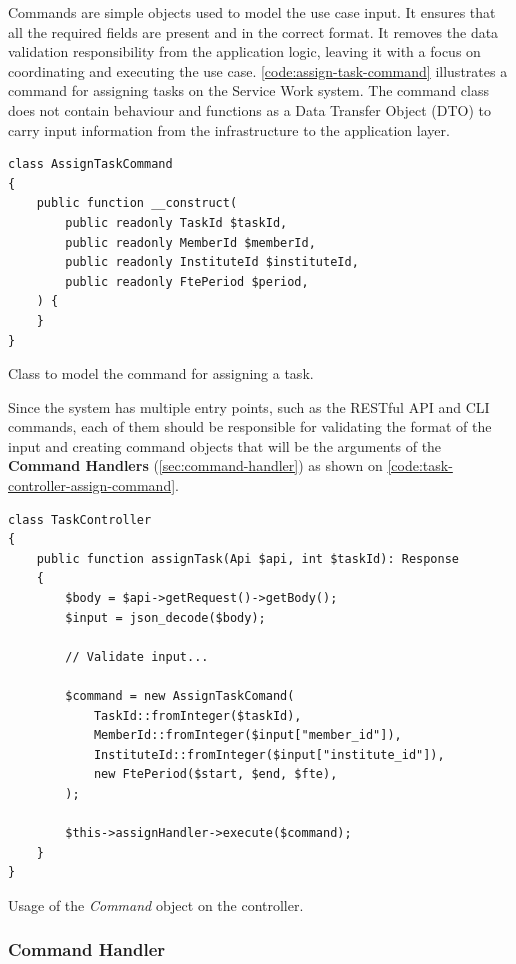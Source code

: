 Commands are simple objects used to model the use case input. It ensures that all the required fields are present and in the correct format. It removes the data validation responsibility from the application logic, leaving it with a focus on coordinating and executing the use case. \autoref{code:assign-task-command} illustrates a command for assigning tasks on the Service Work system. The command class does not contain behaviour and functions as a Data Transfer Object (DTO) to carry input information from the infrastructure to the application layer.

\begin{listing}[htbp]
\begin{verbatim}
class AssignTaskCommand
{
	public function __construct(
    	public readonly TaskId $taskId,
    	public readonly MemberId $memberId,
    	public readonly InstituteId $instituteId,
    	public readonly FtePeriod $period,
	) {
	}
}
\end{verbatim}
\caption{Class to model the command for assigning a task.}
\label{code:assign-task-command}
\end{listing}

Since the system has multiple entry points, such as the RESTful API and CLI commands, each of them should be responsible for validating the format of the input and creating command objects that will be the arguments of the \textbf{Command Handlers} (\autoref{sec:command-handler}) as shown on \autoref{code:task-controller-assign-command}.

\begin{listing}[htbp]
\begin{verbatim}
class TaskController
{
	public function assignTask(Api $api, int $taskId): Response
	{
		$body = $api->getRequest()->getBody();
		$input = json_decode($body);

		// Validate input...

		$command = new AssignTaskComand(
			TaskId::fromInteger($taskId),
			MemberId::fromInteger($input["member_id"]),
			InstituteId::fromInteger($input["institute_id"]),
			new FtePeriod($start, $end, $fte),
		);

		$this->assignHandler->execute($command);
	}
}
\end{verbatim}
\caption{Usage of the \textit{Command} object on the controller.}
\label{code:task-controller-assign-command}
\end{listing}

\subsubsection{Command Handler}
\label{sec:command-handler}

